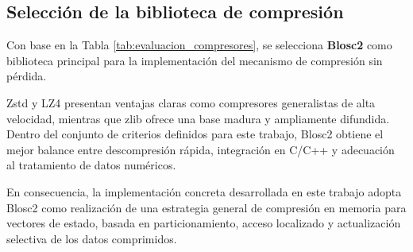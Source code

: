 \subsection{Selección de la biblioteca de compresión}

Con base en la Tabla \ref{tab:evaluacion_compresores}, se selecciona \textbf{Blosc2} como
biblioteca principal para la implementación del mecanismo de compresión sin pérdida.

Zstd y LZ4 presentan ventajas claras como compresores generalistas de alta velocidad, mientras que zlib ofrece una
base madura y ampliamente difundida. Dentro del conjunto de criterios definidos para este trabajo, Blosc2 obtiene el
mejor balance entre descompresión rápida, integración en C/C++ y adecuación al tratamiento de datos numéricos.

En consecuencia, la implementación concreta desarrollada en este trabajo adopta Blosc2 como
realización de una estrategia general de compresión en memoria para vectores de estado,
basada en particionamiento, acceso localizado y actualización selectiva de los datos
comprimidos.
